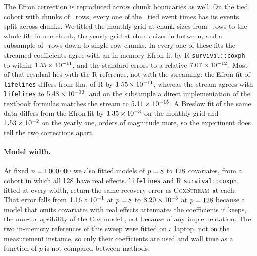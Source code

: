 \documentclass[11pt,a4paper]{article}
\newcommand{\coxstream}{\textsc{CoxStream}}
\begin{document}
The Efron correction is reproduced across chunk boundaries as well. On the
tied cohort with chunks of \TiesRowGroupMin\ rows, every one of the
\TiesNTieGroups\ tied event times has its events split across chunks. We
fitted the monthly grid at chunk sizes from \TiesRowGroupMin\ rows to the
whole file in one chunk, the yearly grid at chunk sizes in between, and a
subsample of \TiesSubN\ rows down to single-row chunks. In every one of these
fits the streamed coefficients agree with an in-memory Efron fit by R
\texttt{survival::coxph} to within $1.55 \times 10^{-11}$, and the standard
errors to a relative $7.07 \times 10^{-12}$. Most of that residual lies with
the R reference, not with the streaming: the Efron fit of \texttt{lifelines}
differs from that of R by $1.55 \times 10^{-11}$, whereas the stream agrees
with \texttt{lifelines} to $5.48 \times 10^{-13}$, and on the subsample a
direct implementation of the textbook formulas matches the stream to
$5.11 \times 10^{-15}$. A Breslow fit of the same data differs from the Efron
fit by $1.35 \times 10^{-3}$ on the monthly grid and
$1.53 \times 10^{-2}$ on the yearly one, orders of magnitude more, so the
experiment does tell the two corrections apart.

\paragraph{Model width.} At fixed $n = 1\,000\,000$ we also fitted models of
$p = 8$ to $128$ covariates, from a cohort in which all
$128$ have real effects. \texttt{lifelines} and R
\texttt{survival::coxph}, fitted at every width, return the same recovery
error as \coxstream\ at each. That error falls from $1.16 \times 10^{-1}$ at
$p=8$ to $8.20 \times 10^{-3}$ at $p=128$ because a model that
omits covariates with real effects attenuates the coefficients it keeps, the
non-collapsibility of the Cox model
\citep{gail1984biased,struthers1986omitted}, not because of any
implementation. The two in-memory references of this sweep were fitted on a
laptop, not on the measurement instance, so only their coefficients are used
and wall time as a function of $p$ is not compared between methods.
\end{document}
